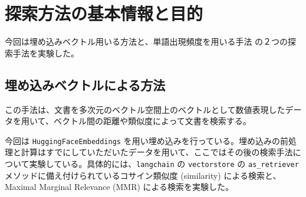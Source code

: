 





% 
\section{探索方法の基本情報と目的}
今回は埋め込みベクトル用いる方法と、単語出現頻度を用いる手法 の２つの探索手法を実験した。



\subsection{埋め込みベクトルによる方法}
この手法は、文書を多次元のベクトル空間上のベクトルとして数値表現したデータを用いて、ベクトル間の距離や類似度によって文書を検索する。 \par
今回は \texttt{HuggingFaceEmbeddings} を用い埋め込みを行っている。埋め込みの前処理と計算はすでにしていただいたデータを用いて、ここではその後の検索手法について実験している。具体的には、\texttt{langchain} の \texttt{vectorstore} の \texttt{as\_retriever} メソッドに備え付けられているコサイン類似度 (similarity) による検索と、Maximal Marginal Relevance (MMR) による検索を実験した。 \par

